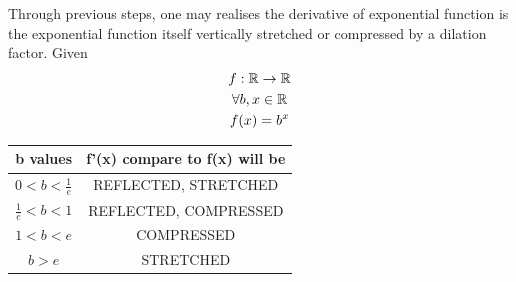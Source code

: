 Through previous steps, one may realises the derivative of exponential function is the exponential function itself vertically stretched or compressed by a dilation factor.
Given 
\begin{gather*}
    f:\mathbb{R} \to \mathbb{R} \\
    \forall b, x \in \mathbb{R} \\ 
    f(x) = b^x
\end{gather*}
\begin{center}
    \begin{tabular}{|c|c|}
    \hline
    b values & f'(x) compare to f(x) will be\\
    \hline
    $0 < b < \tfrac{1}{e}$ & REFLECTED, STRETCHED\\
    \hline
    $\frac{1}{e} < b < 1$ & REFLECTED, COMPRESSED \\
    \hline 
    $1 < b < e$ & COMPRESSED \\
    \hline 
    $b > e$ & STRETCHED \\
    \hline 
\end{tabular}
\end{center}
